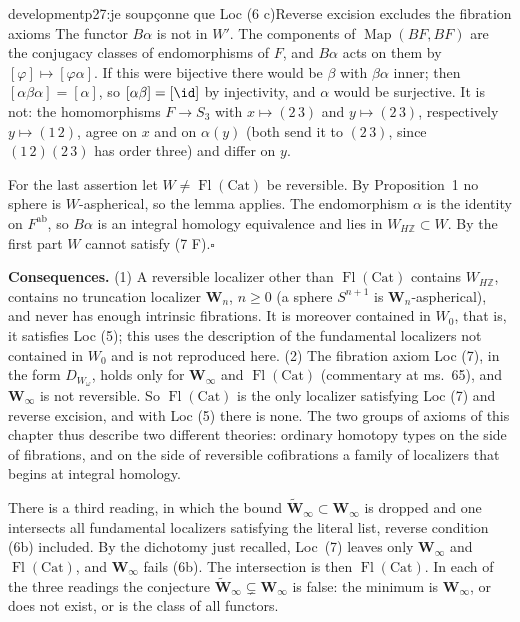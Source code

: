 \begin{dcomment}{development}{p27:je soupçonne que Loc (6 c)}{Reverse excision excludes the fibration axioms}
The functor $B\alpha$ is not in $W'$. The components of $\operatorname{Map}(BF,BF)$ are the conjugacy classes of endomorphisms of $F$, and $B\alpha$ acts on them by $[\varphi]\mapsto[\varphi\alpha]$. If this were bijective there would be $\beta$ with $\beta\alpha$ inner; then $[\alpha\beta\alpha]=[\alpha]$, so $[\alpha\beta]=[\id]$ by injectivity, and $\alpha$ would be surjective. It is not: the homomorphisms $F\to S_3$ with $x\mapsto(2\,3)$ and $y\mapsto(2\,3)$, respectively $y\mapsto(1\,2)$, agree on $x$ and on $\alpha(y)$ (both send it to $(2\,3)$, since $(1\,2)(2\,3)$ has order three) and differ on $y$.

For the last assertion let $W\ne\operatorname{Fl}(\mathrm{Cat})$ be reversible. By Proposition~1 no sphere is $W$-aspherical, so the lemma applies. The endomorphism $\alpha$ is the identity on $F^{\mathrm{ab}}$, so $B\alpha$ is an integral homology equivalence and lies in $W_{H\mathbb Z}\subset W$. By the first part $W$ cannot satisfy (7 F).\hfill$\square$

\textbf{Consequences.}
(1) A reversible localizer other than $\operatorname{Fl}(\mathrm{Cat})$ contains $W_{H\mathbb Z}$, contains no truncation localizer $\mathbf W_n$, $n\geq0$ (a sphere $S^{n+1}$ is $\mathbf W_n$-aspherical), and never has enough intrinsic fibrations. It is moreover contained in $W_0$, that is, it satisfies Loc (5); this uses the description of the fundamental localizers not contained in $W_0$ and is not reproduced here.
(2) The fibration axiom Loc (7), in the form $D_{W_\omega}$, holds only for $\mathbf W_\infty$ and $\operatorname{Fl}(\mathrm{Cat})$ (commentary at ms.~65), and $\mathbf W_\infty$ is not reversible. So $\operatorname{Fl}(\mathrm{Cat})$ is the only localizer satisfying Loc (7) and reverse excision, and with Loc (5) there is none. The two groups of axioms of this chapter thus describe two different theories: ordinary homotopy types on the side of fibrations, and on the side of reversible cofibrations a family of localizers that begins at integral homology.
\end{dcomment}

There is a third reading, in which the bound $\widetilde{\mathbf W}_\infty\subset\mathbf W_\infty$ is dropped and one intersects all fundamental localizers satisfying the literal list, reverse condition (6b) included. By the dichotomy just recalled, Loc~(7) leaves only $\mathbf W_\infty$ and $\operatorname{Fl}(\mathrm{Cat})$, and $\mathbf W_\infty$ fails (6b). The intersection is then $\operatorname{Fl}(\mathrm{Cat})$. In each of the three readings the conjecture $\widetilde{\mathbf W}_\infty\subsetneq\mathbf W_\infty$ is false: the minimum is $\mathbf W_\infty$, or does not exist, or is the class of all functors.


